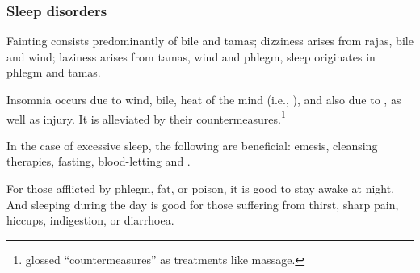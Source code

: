 \begin{translation}
\subsubsection{Sleep disorders}

\item[56] 
\begin{sloka}
 Fainting consists predominantly of bile and tamas;
dizziness arises from rajas, bile and wind; laziness arises from
tamas, wind and phlegm, sleep originates in phlegm and tamas.
\end{sloka}

\item[42]

\begin{sloka}
    Insomnia occurs due to wind, bile, heat of the mind (i.e.,
), and also due to , as well
as injury. It is alleviated by their 
countermeasures.\footnote{ glossed 
“countermeasures” as treatments like massage.}
\end{sloka}

%
%
%
%
%
%
%

\item[47]

\begin{sloka}
    In the case of excessive sleep, the following are beneficial:
emesis, cleansing therapies, fasting, blood-letting and
.
\end{sloka}

\item[48]

\begin{sloka}
    For those afflicted by phlegm, fat, or poison, it is good to stay awake at
night. And sleeping during the day is good 
for those suffering from thirst, sharp pain, hiccups,
indigestion, or diarrhoea.
\end{sloka}


\end{translation}
